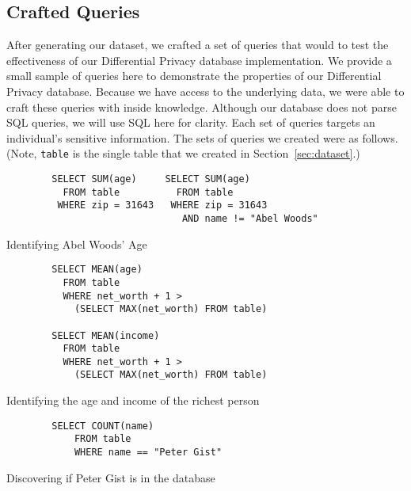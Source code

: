 \documentclass[conference,11pt]{IEEEtran}
\begin{document}
\subsection{Crafted Queries}\label{sec:crafted-queries}
After generating our dataset, we crafted a set of queries that would to test the
effectiveness of our Differential Privacy database implementation. We provide a
small sample of queries here to demonstrate the properties of our Differential
Privacy database. Because we have access to the underlying data, we were able to
craft these queries with inside knowledge. Although our database does not parse
SQL queries, we will use SQL here for clarity. Each set of queries targets an
individual's sensitive information. The sets of queries we created were as
follows. (Note, \texttt{table} is the single table that we created in
Section~\ref{sec:dataset}.)

\begin{listing}[H]
    \begin{verbatim}
        SELECT SUM(age)     SELECT SUM(age)
          FROM table          FROM table
         WHERE zip = 31643   WHERE zip = 31643
                               AND name != "Abel Woods"
    \end{verbatim}
    \caption{Identifying Abel Woods' Age}
    \label{qs:abel}
\end{listing}

\begin{listing}[H]
    \begin{verbatim}
        SELECT MEAN(age)
          FROM table
          WHERE net_worth + 1 >
            (SELECT MAX(net_worth) FROM table)

        SELECT MEAN(income)
          FROM table
          WHERE net_worth + 1 >
            (SELECT MAX(net_worth) FROM table)
    \end{verbatim}
    \caption{Identifying the age and income of the richest person}
    \label{qs:richest-person}
\end{listing}

\begin{listing}[H]
    \begin{verbatim}
        SELECT COUNT(name)
            FROM table
            WHERE name == "Peter Gist"
    \end{verbatim}
    \caption{Discovering if Peter Gist is in the database}
    \label{qs:peter}
\end{listing}

\end{document}
